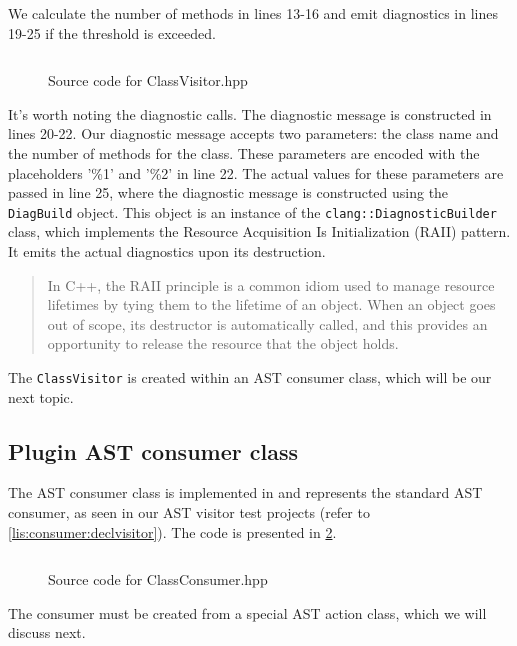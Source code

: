 We calculate the number of methods in lines 13-16 and emit diagnostics in lines
19-25 if the threshold is exceeded. 
\begin{figure}[H]
  \inputminted{c++}{src/part1/ch4_baselibs/classcomplexity/ClassVisitor.hpp}
  \caption{Source code for ClassVisitor.hpp}
  \label{lis:ch4:ClassComplexityChecker:Visitor}
\end{figure}
It's worth noting the diagnostic calls. The diagnostic message is constructed in
lines 20-22. Our diagnostic message accepts two parameters: the class name and
the number of methods for the class. These parameters are encoded with the
placeholders '\%1' and '\%2' in line 22. The actual values for these parameters
are passed in line 25, where the diagnostic message is constructed using the
\texttt{DiagBuild} object. This object is an instance of the
\texttt{clang::DiagnosticBuilder} class, which implements the Resource
Acquisition Is Initialization (RAII) pattern. It emits the actual diagnostics
upon its destruction. 

\begin{quote}
  In C++, the RAII principle is a common idiom used to manage resource lifetimes
  by tying them to the lifetime of an object. When an object goes out of scope,
  its destructor is automatically called, and this provides an opportunity to
  release the resource that the object holds. 
\end{quote}

The \texttt{ClassVisitor} is created within an AST consumer class,
which will be our next topic. 

\subsection{Plugin AST consumer class}
The AST consumer class is implemented in  and
represents the standard AST consumer, as seen in our AST visitor test projects
(refer to \cref{lis:consumer:declvisitor}). The code is presented in
\cref{lis:ch4:ClassComplexityChecker:Action}. 
\begin{figure}[H]
  \inputminted{c++}{src/part1/ch4_baselibs/classcomplexity/ClassConsumer.hpp}
  \caption{Source code for ClassConsumer.hpp}
  \label{lis:ch4:ClassComplexityChecker:Action}
\end{figure}
The consumer must be created from a special AST action class, which we will
discuss next. 

